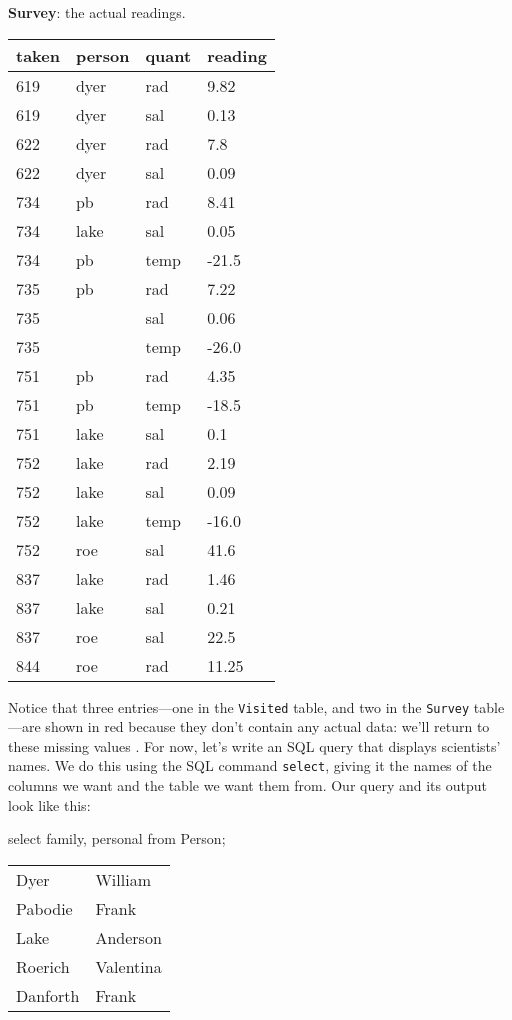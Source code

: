 \documentclass{book}
\begin{document}
\textbf{Survey}: the actual readings.

\begin{tabular}{llll}
taken & person & quant & reading \\
\hline
619 & dyer & rad & 9.82 \\
619 & dyer & sal & 0.13 \\
622 & dyer & rad & 7.8 \\
622 & dyer & sal & 0.09 \\
734 & pb & rad & 8.41 \\
734 & lake & sal & 0.05 \\
734 & pb & temp & -21.5 \\
735 & pb & rad & 7.22 \\
735 & ~ & sal & 0.06 \\
735 & ~ & temp & -26.0 \\
751 & pb & rad & 4.35 \\
751 & pb & temp & -18.5 \\
751 & lake & sal & 0.1 \\
752 & lake & rad & 2.19 \\
752 & lake & sal & 0.09 \\
752 & lake & temp & -16.0 \\
752 & roe & sal & 41.6 \\
837 & lake & rad & 1.46 \\
837 & lake & sal & 0.21 \\
837 & roe & sal & 22.5 \\
844 & roe & rad & 11.25 \\
\end{tabular}

Notice that three entries---one in the \texttt{Visited} table, and two
in the \texttt{Survey} table---are shown in red because they don't
contain any actual data: we'll return to these missing values
. For now, let's write an SQL query that
displays scientists' names. We do this using the SQL command
\texttt{select}, giving it the names of the columns we want and the
table we want them from. Our query and its output look like this:

\begin{VerbIn}
\end{VerbIn}

\begin{VerbIn}
select family, personal from Person;
\end{VerbIn}

\begin{tabular}{ll}
Dyer & William \\
Pabodie & Frank \\
Lake & Anderson \\
Roerich & Valentina \\
Danforth & Frank \\
\end{tabular}
\end{document}
